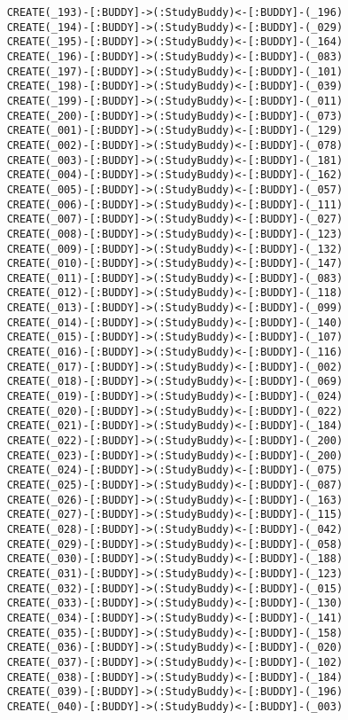 \begin{lstlisting}
	CREATE(_193)-[:BUDDY]->(:StudyBuddy)<-[:BUDDY]-(_196)
	CREATE(_194)-[:BUDDY]->(:StudyBuddy)<-[:BUDDY]-(_029)
	CREATE(_195)-[:BUDDY]->(:StudyBuddy)<-[:BUDDY]-(_164)
	CREATE(_196)-[:BUDDY]->(:StudyBuddy)<-[:BUDDY]-(_083)
	CREATE(_197)-[:BUDDY]->(:StudyBuddy)<-[:BUDDY]-(_101)
	CREATE(_198)-[:BUDDY]->(:StudyBuddy)<-[:BUDDY]-(_039)
	CREATE(_199)-[:BUDDY]->(:StudyBuddy)<-[:BUDDY]-(_011)
	CREATE(_200)-[:BUDDY]->(:StudyBuddy)<-[:BUDDY]-(_073)
	CREATE(_001)-[:BUDDY]->(:StudyBuddy)<-[:BUDDY]-(_129)
	CREATE(_002)-[:BUDDY]->(:StudyBuddy)<-[:BUDDY]-(_078)
	CREATE(_003)-[:BUDDY]->(:StudyBuddy)<-[:BUDDY]-(_181)
	CREATE(_004)-[:BUDDY]->(:StudyBuddy)<-[:BUDDY]-(_162)
	CREATE(_005)-[:BUDDY]->(:StudyBuddy)<-[:BUDDY]-(_057)
	CREATE(_006)-[:BUDDY]->(:StudyBuddy)<-[:BUDDY]-(_111)
	CREATE(_007)-[:BUDDY]->(:StudyBuddy)<-[:BUDDY]-(_027)
	CREATE(_008)-[:BUDDY]->(:StudyBuddy)<-[:BUDDY]-(_123)
	CREATE(_009)-[:BUDDY]->(:StudyBuddy)<-[:BUDDY]-(_132)
	CREATE(_010)-[:BUDDY]->(:StudyBuddy)<-[:BUDDY]-(_147)
	CREATE(_011)-[:BUDDY]->(:StudyBuddy)<-[:BUDDY]-(_083)
	CREATE(_012)-[:BUDDY]->(:StudyBuddy)<-[:BUDDY]-(_118)
	CREATE(_013)-[:BUDDY]->(:StudyBuddy)<-[:BUDDY]-(_099)
	CREATE(_014)-[:BUDDY]->(:StudyBuddy)<-[:BUDDY]-(_140)
	CREATE(_015)-[:BUDDY]->(:StudyBuddy)<-[:BUDDY]-(_107)
	CREATE(_016)-[:BUDDY]->(:StudyBuddy)<-[:BUDDY]-(_116)
	CREATE(_017)-[:BUDDY]->(:StudyBuddy)<-[:BUDDY]-(_002)
	CREATE(_018)-[:BUDDY]->(:StudyBuddy)<-[:BUDDY]-(_069)
	CREATE(_019)-[:BUDDY]->(:StudyBuddy)<-[:BUDDY]-(_024)
	CREATE(_020)-[:BUDDY]->(:StudyBuddy)<-[:BUDDY]-(_022)
	CREATE(_021)-[:BUDDY]->(:StudyBuddy)<-[:BUDDY]-(_184)
	CREATE(_022)-[:BUDDY]->(:StudyBuddy)<-[:BUDDY]-(_200)
	CREATE(_023)-[:BUDDY]->(:StudyBuddy)<-[:BUDDY]-(_200)
	CREATE(_024)-[:BUDDY]->(:StudyBuddy)<-[:BUDDY]-(_075)
	CREATE(_025)-[:BUDDY]->(:StudyBuddy)<-[:BUDDY]-(_087)
	CREATE(_026)-[:BUDDY]->(:StudyBuddy)<-[:BUDDY]-(_163)
	CREATE(_027)-[:BUDDY]->(:StudyBuddy)<-[:BUDDY]-(_115)
	CREATE(_028)-[:BUDDY]->(:StudyBuddy)<-[:BUDDY]-(_042)
	CREATE(_029)-[:BUDDY]->(:StudyBuddy)<-[:BUDDY]-(_058)
	CREATE(_030)-[:BUDDY]->(:StudyBuddy)<-[:BUDDY]-(_188)
	CREATE(_031)-[:BUDDY]->(:StudyBuddy)<-[:BUDDY]-(_123)
	CREATE(_032)-[:BUDDY]->(:StudyBuddy)<-[:BUDDY]-(_015)
	CREATE(_033)-[:BUDDY]->(:StudyBuddy)<-[:BUDDY]-(_130)
	CREATE(_034)-[:BUDDY]->(:StudyBuddy)<-[:BUDDY]-(_141)
	CREATE(_035)-[:BUDDY]->(:StudyBuddy)<-[:BUDDY]-(_158)
	CREATE(_036)-[:BUDDY]->(:StudyBuddy)<-[:BUDDY]-(_020)
	CREATE(_037)-[:BUDDY]->(:StudyBuddy)<-[:BUDDY]-(_102)
	CREATE(_038)-[:BUDDY]->(:StudyBuddy)<-[:BUDDY]-(_184)
	CREATE(_039)-[:BUDDY]->(:StudyBuddy)<-[:BUDDY]-(_196)
	CREATE(_040)-[:BUDDY]->(:StudyBuddy)<-[:BUDDY]-(_003)

\end{lstlisting}
